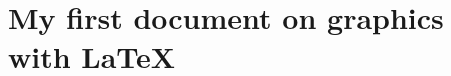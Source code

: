 \documentclass{article}
\begin{document}
\section{My first document on graphics with \LaTeX}
\end{document}
